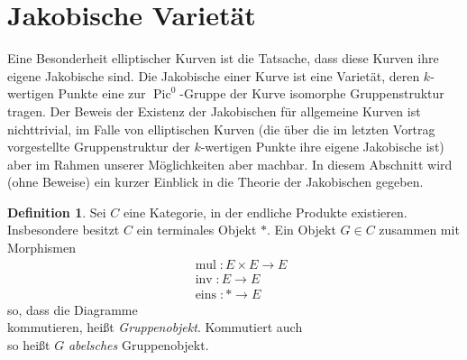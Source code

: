 \documentclass{amsart}
\theoremstyle{plain}
\theoremstyle{definition}
\newtheorem{definition}[subsection]{Definition}
\newcommand{\pic}{\operatorname{Pic}}
\begin{document}
%
%

\section{Jakobische Varietät}
\label{section-jakobische-varietaet}

Eine Besonderheit elliptischer Kurven ist die Tatsache, dass diese Kurven ihre eigene Jakobische sind.
Die Jakobische einer Kurve ist eine Varietät, deren $k$-wertigen Punkte eine zur $\pic^0$-Gruppe der Kurve isomorphe Gruppenstruktur tragen.
Der Beweis der Existenz der Jakobischen für allgemeine Kurven ist nichttrivial, im Falle von elliptischen Kurven (die über die im letzten Vortrag vorgestellte Gruppenstruktur der $k$-wertigen Punkte ihre eigene Jakobische ist) aber im Rahmen unserer Möglichkeiten aber machbar.
In diesem Abschnitt wird (ohne Beweise) ein kurzer Einblick in die Theorie der Jakobischen gegeben.

\begin{definition}
	\label{def-gruppenobjekt}
	Sei $C$ eine Kategorie, in der endliche Produkte existieren. Insbesondere besitzt $C$ ein terminales Objekt $*$.
	Ein Objekt $G \in C$ zusammen mit Morphismen
	\begin{align*}
		& \operatorname{mul} \colon E \times E \rightarrow E \\
		& \operatorname{inv} \colon E \rightarrow E \\
		& \operatorname{eins} \colon * \rightarrow E
	\end{align*}
	so, dass die Diagramme
	\begin{equation*}
	\end{equation*}
	kommutieren, heißt {\it Gruppenobjekt}.
	Kommutiert auch
	\begin{equation*}
	\end{equation*}
	so heißt $G$ {\it abelsches} Gruppenobjekt.
\end{definition}
\end{document}
